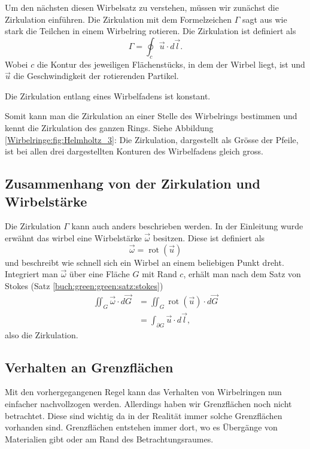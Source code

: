 Um den nächsten diesen Wirbelsatz zu verstehen, müssen wir zunächst die Zirkulation einführen.
Die Zirkulation mit dem Formelzeichen \(\Gamma\) sagt aus wie stark die Teilchen in einem Wirbelring rotieren.
Die Zirkulation ist definiert als 
\[
\Gamma
= 
\oint_{c} \vec{u} \cdot d \vec{l}.
\]
Wobei \(c\) die Kontur des jeweiligen Flächenstücks, in dem der Wirbel liegt, ist und \(\vec{u}\) die Geschwindigkeit der rotierenden Partikel.

\begin{satz}
    \label{Wirbelringe:satz:wirbelsatz3}
    Die Zirkulation entlang eines Wirbelfadens ist konstant. 
\end{satz}

Somit kann man die Zirkulation an einer Stelle des Wirbelrings bestimmen und kennt die Zirkulation des ganzen Rings.
Siehe Abbildung \ref{Wirbelringe:fig:Helmholtz_3}: 
Die Zirkulation, dargestellt als Grösse der Pfeile, ist bei allen drei dargestellten Konturen des Wirbelfadens gleich gross.

\subsection{Zusammenhang von der Zirkulation und Wirbelstärke \label{Wirbelringe:Stokes}}

Die Zirkulation \(\Gamma\) kann auch anders beschrieben werden. 
In der Einleitung wurde erwähnt das wirbel eine Wirbelstärke \(\vec{\omega}\) besitzen.
Diese ist definiert als
\[
\vec{\omega}
=
\operatorname{rot}(\vec{u})
\]
und beschreibt wie schnell sich ein Wirbel an einem beliebigen Punkt dreht.
Integriert man \(\vec{\omega}\) über eine Fläche \(G\) mit Rand \(c\), erhält man nach dem Satz von Stokes (Satz \ref{buch:green:green:satz:stokes})
\begin{align*}
\iint_{G} \vec{\omega} \cdot d \vec{G}
&=
\iint_{G} \operatorname{rot}(\vec{u})\cdot  d \vec{G}\\
&=
\int_{\partial G} \vec{u} \cdot d\vec{l},
\end{align*}
also die Zirkulation.

\subsection{Verhalten an Grenzflächen \label{Wirbelringe:Grenzflaechen}}

Mit den vorhergegangenen Regel kann das Verhalten von Wirbelringen nun einfacher nachvollzogen werden.
Allerdings haben wir Grenzflächen noch nicht betrachtet.
Diese sind wichtig da in der Realität immer solche Grenzflächen vorhanden sind.
Grenzflächen entstehen immer dort, wo es Übergänge von Materialien gibt oder am Rand des Betrachtungsraumes.


